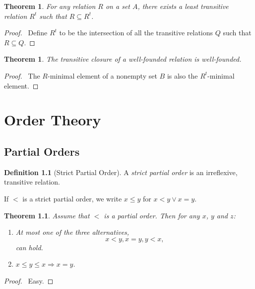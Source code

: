 \documentclass{report}
\let\qed\relax
\newtheorem{theorem}[axiom]{Theorem}
\theoremstyle{definition}
\newtheorem{definition}[axiom]{Definition}
\begin{document}
    \begin{theorem}
        \label{theorem:tc}
        For any relation $R$ on a set $A$, there exists a least transitive relation $R^t$ such that $R
        \subseteq R^t$.
    \end{theorem}

    \begin{proof}
        \pf\ Define $R^t$ to be the intersection of all the transitive relations $Q$ such that $R \subseteq Q$. \qed
    \end{proof}

    \begin{theorem}
        \label{theorem:tc_well_founded}
        The transitive closure of a well-founded relation is well-founded.
    \end{theorem}

    \begin{proof}
        \pf\ The $R$-minimal element of a nonempty set $B$ is also the $R^t$-minimal element. \qed
    \end{proof}

    \chapter{Order Theory}

    \section{Partial Orders}

    \begin{definition}[Strict Partial Order]
        A \emph{strict partial order} is an irreflexive, transitive relation.

        If $<$ is a strict partial order, we write $x \leq y$ for $x < y \vee x = y$.
    \end{definition}

    \begin{theorem}
        Assume that $<$ is a partial order. Then for any $x$, $y$ and $z$:
        \begin{enumerate}
            \item \emph{At most} one of the three alternatives,
            \[ x < y, x = y, y < x, \]
            can hold.
            \item $x \leq y \leq x \Rightarrow x = y$.
        \end{enumerate}
    \end{theorem}

    \begin{proof}
        \pf\ Easy. \qed
    \end{proof}
\end{document}
